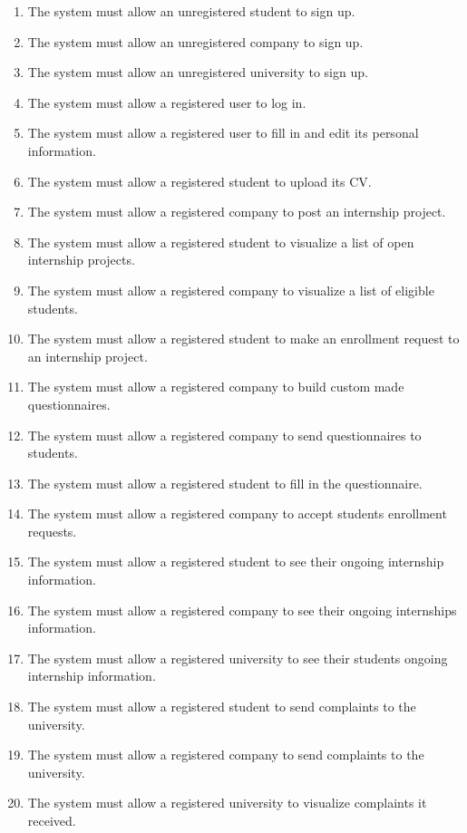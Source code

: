 \begin{enumerate}[label=\textbf{R\arabic* -}]
    \item The system must allow an unregistered student to sign up.
    \item The system must allow an unregistered company to sign up.
    \item The system must allow an unregistered university to sign up.
    \item The system must allow a registered user to log in.
    \item The system must allow a registered user to fill in and edit its personal information.
    \item The system must allow a registered student to upload its CV.
    \item The system must allow a registered company to post an internship project.
    \item The system must allow a registered student to visualize a list of open internship projects.
    \item The system must allow a registered company to visualize a list of eligible students.
    \item The system must allow a registered student to make an enrollment request to an internship project.
    \item The system must allow a registered company to build custom made questionnaires.
    \item The system must allow a registered company to send questionnaires to students.
    \item The system must allow a registered student to fill in the questionnaire.
    \item The system must allow a registered company to accept students enrollment requests.
    \item The system must allow a registered student to see their ongoing internship information.
    \item The system must allow a registered company to see their ongoing internships information.
    \item The system must allow a registered university to see their students ongoing internship information.
    \item The system must allow a registered student to send complaints to the university.
    \item The system must allow a registered company to send complaints to the university.
    \item The system must allow a registered university to visualize complaints it received.

\end{enumerate}
